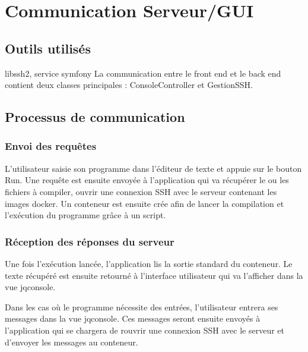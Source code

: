 \chapter{Communication Serveur/GUI}

\section{Outils utilisés}

libssh2, service symfony
La communication entre le front end et le back end contient deux classes principales : ConsoleController et GestionSSH.

\section{Processus de communication}

\subsection{Envoi des requêtes}

\par L’utilisateur saisie son programme dans l’éditeur de texte et appuie sur le bouton Run. Une requête est ensuite envoyée à l'application qui va récupérer le ou les fichiers à compiler, ouvrir une connexion SSH avec le serveur contenant les images docker. Un conteneur est ensuite crée afin de lancer la compilation et l’exécution du programme grâce à un script. 

\subsection{Réception des réponses du serveur}

\par Une fois l'exécution lancée, l'application lis la sortie standard du conteneur. Le texte récupéré est ensuite retourné à l'interface utilisateur qui va l'afficher dans la vue jqconsole.

\par Dans les cas où le programme nécessite des entrées, l'utilisateur entrera ses messages dans la vue jqconsole. Ces messages seront ensuite envoyés à l'application qui se chargera de rouvrir une connexion SSH avec le serveur et d'envoyer les messages au conteneur.